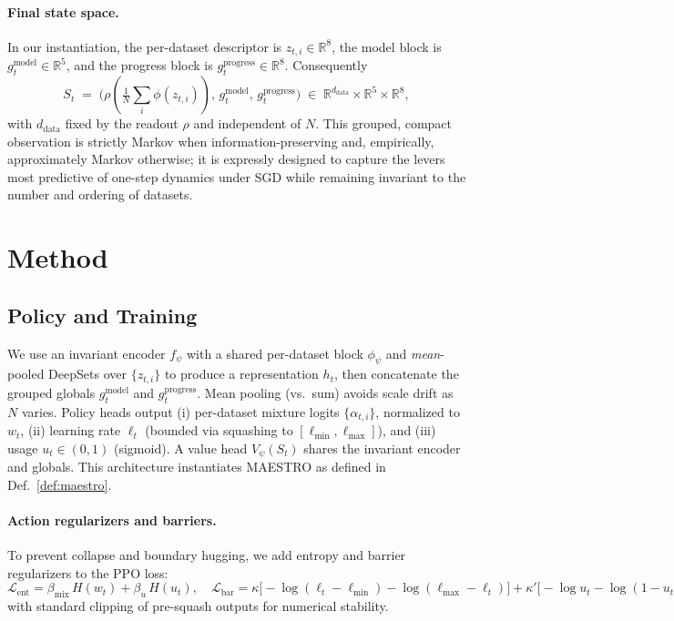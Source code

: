 \documentclass[11pt]{article}
\newcommand{\R}{\mathbb{R}}
\newcommand{\1}{\mathbf{1}}
\newcommand{\MAESTRO}{\textsc{MAESTRO}\xspace}
\begin{document}
\paragraph{Final state space.}
In our instantiation, the per-dataset descriptor is $z_{t,i}\in\R^{8}$, the model block is $g^{\text{model}}_t\in\R^{5}$, and the progress block is $g^{\text{progress}}_t\in\R^{8}$. Consequently
\[
S_t \;=\; \big(\rho(\tfrac{1}{N}\sum_i \phi(z_{t,i})),\, g^{\text{model}}_t,\, g^{\text{progress}}_t\big)
\;\in\;
\R^{d_{\text{data}}}\times\R^{5}\times\R^{8},
\]
with $d_{\text{data}}$ fixed by the readout $\rho$ and independent of $N$. This grouped, compact observation is strictly Markov when information-preserving and, empirically, approximately Markov otherwise; it is expressly designed to capture the levers most predictive of one-step dynamics under SGD while remaining invariant to the number and ordering of datasets.


\section{Method}
\subsection{Policy and Training}
We use an invariant encoder $f_\psi$ with a shared per-dataset block $\phi_\psi$ and \emph{mean}-pooled DeepSets over $\{z_{t,i}\}$ to produce a representation $h_t$, then concatenate the grouped globals $g^{\text{model}}_t$ and $g^{\text{progress}}_t$. Mean pooling (vs.\ sum) avoids scale drift as $N$ varies.
Policy heads output (i) per-dataset mixture logits $\{\alpha_{t,i}\}$, normalized to $w_t$, (ii) learning rate $\ell_t$ (bounded via squashing to $[\ell_{\min},\ell_{\max}]$), and (iii) usage $u_t\in(0,1)$ (sigmoid).
A value head $V_\psi(S_t)$ shares the invariant encoder and globals. This architecture instantiates \MAESTRO{} as defined in Def.~\ref{def:maestro}.

\paragraph{Action regularizers and barriers.}
To prevent collapse and boundary hugging, we add entropy and barrier regularizers to the PPO loss:
\(
\mathcal{L}_{\text{ent}}= \beta_{\text{mix}}\, H(w_t) + \beta_u\, H(u_t),\quad
\mathcal{L}_{\text{bar}}= \kappa\big[-\log(\ell_t-\ell_{\min})-\log(\ell_{\max}-\ell_t)\big] + \kappa'\big[-\log u_t - \log (1-u_t)\big],
\)
with standard clipping of pre-squash outputs for numerical stability.
\end{document}
